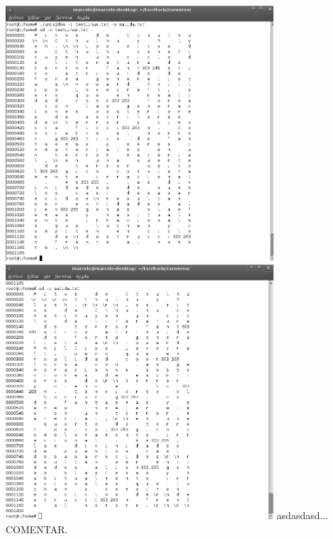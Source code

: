 \documentclass[a4paper,10pt]{article}
\begin{document}
\begin{itemize}
      \newline
      \includegraphics[width=10cm, viewport=0 0 837 798]{../Informe/Imagenes/prueba3-archivo-unix2dos1.png}
      \newline
      \includegraphics[width=10cm, viewport=0 0 841 799]{../Informe/Imagenes/prueba3-archivo-unix2dos2.png}		
      \newline
      asdasdasd... COMENTAR.
      \end{itemize}
\end{document}
